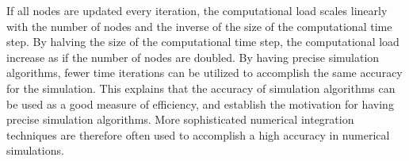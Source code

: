 	If all nodes are updated every iteration, the computational load scales linearly with the number of nodes and the inverse of the size of the computational time step.
	By halving the size of the computational time step, the computational load increase as if the number of nodes are doubled.
	By having precise simulation algorithms, fewer time iterations can be utilized to accomplish the same accuracy for the simulation.
	This explains that the accuracy of simulation algorithms can be used as a good measure of efficiency, and establish the motivation for having precise simulation algorithms.
	More sophisticated numerical integration techniques are therefore often used to accomplish a high accuracy in numerical simulations\cite{PlesserStraubeMorrisonPlesser2007}.





% 
% 
 

